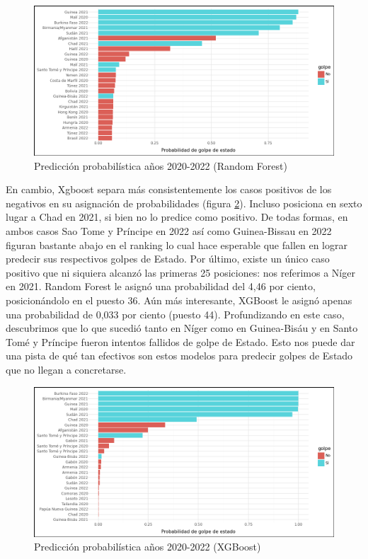 \documentclass{article}
\begin{document}
\begin{figure}[H]
  \centering  
  \includegraphics[width=1\textwidth]{5_prob_rf.png}
  \caption{Predicción probabilística años 2020-2022 (Random Forest) \label{fig:prob_rf}}
\end{figure}

En cambio, Xgboost separa  más consistentemente los casos positivos de los negativos
en su asignación de probabilidades (figura \ref{fig:prob_xgb}). Incluso posiciona en sexto lugar
a Chad en 2021, si bien no lo predice como positivo. De todas formas, en ambos casos 
Sao Tome y Príncipe en 2022 así como Guinea-Bissau en 2022 figuran bastante abajo en el ranking
lo cual hace esperable que fallen en lograr predecir sus respectivos golpes de Estado. Por 
último, existe un único caso positivo que ni siquiera alcanzó las primeras 25 posiciones: nos
referimos a Níger en 2021. Random Forest le asignó una probabilidad del 4,46 por ciento, 
posicionándolo en el puesto 36. Aún más interesante, XGBoost le asignó apenas una probabilidad
de 0,033 por ciento (puesto 44). Profundizando en este caso, descubrimos que lo que sucedió tanto en 
Níger como en Guinea-Bisáu y en Santo Tomé y Príncipe fueron intentos fallidos de golpe de Estado.
Esto nos puede dar una pista de qué tan efectivos son estos modelos para predecir golpes de Estado 
que no llegan a concretarse.

\begin{figure}[H]
  \centering  
  \includegraphics[width=1\textwidth]{6_prob_xgb.png}
  \caption{Predicción probabilística años 2020-2022 (XGBoost) \label{fig:prob_xgb}}
\end{figure}
\end{document}
